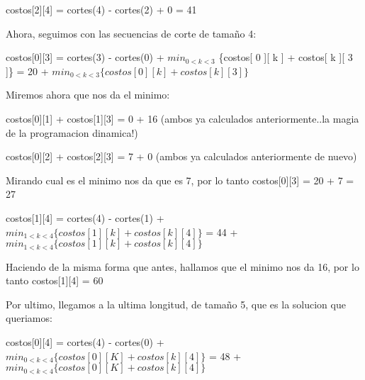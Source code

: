 \documentclass[12pt, a4paper,english,spanish]{article}
\begin{document}
\vspace{0.02cm}

costos[2][4] = cortes(4) - cortes(2) + 0 = 41

\vspace{0.5cm}

Ahora, seguimos con las secuencias de corte de tama\~no 4:

\vspace{0.5cm}

costos[0][3] = cortes(3) - cortes(0) + $ min_{0 < k < 3}$  \{costos[ 0 ][ k ] + costos[ k ][ 3 ]\} = 20 + $ min_{0 < k < 3} \{ costos[ 0 ][ k ] + costos[ k ][ 3 ]\} $

\vspace{0.5cm}

Miremos ahora que nos da el minimo:

\vspace{0.5cm}

costos[0][1] + costos[1][3] = 0 + 16 (ambos ya calculados anteriormente..la magia de la programacion dinamica!)

\vspace{0.02cm}

costos[0][2] + costos[2][3] = 7 + 0 (ambos ya calculados anteriormente de nuevo)

\vspace{0.5cm}

Mirando cual es el minimo nos da que es 7, por lo tanto costos[0][3] = 20 + 7 = 27

\vspace{0.5cm}

costos[1][4] = cortes(4) - cortes(1) + $min_{1 < k < 4}\{ costos[ 1 ][ k ] + costos[ k ][ 4 ] \}$ = 44 + $min_{1 < k < 4}\{ costos[ 1 ][ k ] + costos[ k ][ 4 ] \}$

\vspace{0.5cm}

Haciendo de la misma forma que antes, hallamos que el minimo nos da 16, por lo tanto costos[1][4] = 60

\vspace{0.5cm}

Por ultimo, llegamos a la ultima longitud, de tama\~no 5, que es la solucion que queriamos:

\vspace{0.5cm}

costos[0][4] = cortes(4) - cortes(0) + $min_{0 < k < 4}\{ costos[ 0 ][ K ] + costos[ k ][ 4 ] \}$ = 48 + $min_{0 < k < 4}\{ costos[ 0 ][ K ] + costos[ k ][ 4 ] \}$
\end{document}
